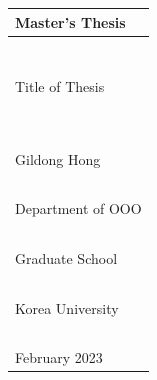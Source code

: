 \documentclass{report}
\begin{document}

\newpage
\noindent
\begin{tabularx}{\textwidth}{|>{\centering\arraybackslash}X |}
\arrayrulecolor{lgray}
\hline
\Large Master's Thesis \\\hline
~\vspace{70pt}\\\hline %
\huge Title of Thesis\par\vspace{98pt} %
~\vspace{14pt}\\\hline %
\Large Gildong Hong\\\hline %
~\\\hline %
\Large Department of OOO \\\hline %
~\vspace{28pt}\\\hline %
\LARGE Graduate School \\\hline
~\\\hline %
\LARGE Korea University \\\hline
~\vspace{14pt}\\\hline %
\large February 2023 \\\hline %
\end{tabularx}
\end{document}
